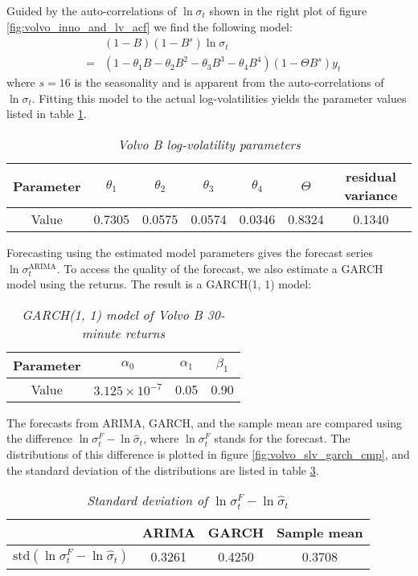 Guided by the auto-correlations of $\ln\sigma_t$ shown in the right
plot of figure \ref{fig:volvo_inno_and_lv_acf} we find the following
model:
\begin{eqnarray}
  && (1 - B)(1 - B^s) \ln \sigma_t \nonumber \\
  &=& (1 - \theta_1 B - \theta_2B^2 -
  \theta_3B^3 - \theta_4B^4) (1 - \Theta B^s)
  y_t \label{eq:volvo_lv_model}
\end{eqnarray}
where $s = 16$ is the seasonality and is apparent from the
auto-correlations of $\ln\sigma_t$. Fitting this model to the
actual log-volatilities yields the parameter values listed in table
\ref{tab:volvo_params}.
\begin{table}[htb!]
  \centering
  \begin{tabular}{|c|c|c|c|c|c|c|}
    \hline
    Parameter & $\theta_1$ & $\theta_2$ & $\theta_3$ & $\theta_4$ &
    $\Theta$ & residual variance \\
    \hline
    Value & 0.7305 & 0.0575 & 0.0574 & 0.0346 & 0.8324 & 0.1340\\
    \hline
  \end{tabular}
  \caption{\small \it Volvo B log-volatility parameters}
  \label{tab:volvo_params}
\end{table}
Forecasting using the estimated model parameters gives the forecast
series $\ln \sigma^{\text{ARIMA}}_t$. To access the quality of the
forecast, we also estimate a GARCH model using the returns. The result
is a GARCH(1, 1) model:
\begin{table}[htb!]
  \centering
  \begin{tabular}{|c|c|c|c|}
    \hline
    Parameter & $\alpha_0$ & $\alpha_1$  & $\beta_1$ \\
    \hline
    Value & $3.125 \times 10^{-7}$ & 0.05 & 0.90 \\
    \hline
  \end{tabular}
  \caption{\small \it GARCH(1, 1) model of Volvo B 30-minute returns}
  \label{tab:volvo_garch}
\end{table}

The forecasts from ARIMA, GARCH, and the sample mean are compared
using the difference $\ln \sigma^F_t - \ln\hat{\sigma}_t$, where $\ln
\sigma^F_t$ stands for the forecast. The distributions of this
difference is plotted in figure \ref{fig:volvo_slv_garch_cmp}, and
the standard deviation of the distributions are listed in table
\ref{tab:volvo_slv_garch_cmp}.
\begin{table}[htb!]
  \centering
  \begin{tabular}{|c|c|c|c|}
    \hline
    & ARIMA & GARCH & Sample mean \\
    \hline
    $\text{std}(\ln \sigma^F_t - \ln \hat{\sigma}_t)$ & 0.3261 &
    0.4250 & 0.3708 \\
    \hline
  \end{tabular}
  \caption{\small \it Standard deviation of $\ln\sigma^F_t -
    \ln\hat{\sigma}_t$}
  \label{tab:volvo_slv_garch_cmp}
\end{table}

